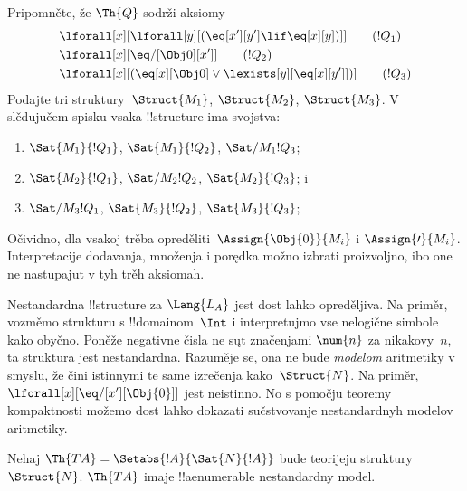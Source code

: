 \documentclass[../../../include/open-logic-section]{subfiles}
\begin{document}
\begin{prob}
Pripomněte, že $\Th{Q}$ sodrži aksiomy
\begin{align*}
& \lforall[x][\lforall[y][(\eq[x'][y'] \lif \eq[x][y])]] \tag{$!Q_1$}\\
& \lforall[x][\eq/[\Obj 0][x']] \tag{$!Q_2$}\\
& \lforall[x][(\eq[x][\Obj 0] \lor \lexists[y][\eq[x][y']])] \tag{$!Q_3$}
\end{align*}
Podajte tri struktury~$\Struct{M_1}$, $\Struct{M_2}$, $\Struct{M_3}$. V
slědujučem spisku vsaka !!{structure} ima svojstva:
\begin{enumerate}
\item $\Sat{M_1}{!Q_1}$, $\Sat{M_1}{!Q_2}$, $\Sat/{M_1}{!Q_3}$;
\item $\Sat{M_2}{!Q_1}$, $\Sat/{M_2}{!Q_2}$, $\Sat{M_2}{!Q_3}$; i
\item $\Sat/{M_3}{!Q_1}$, $\Sat{M_3}{!Q_2}$, $\Sat{M_3}{!Q_3}$;
\end{enumerate}
Očividno, dla vsakoj trěba opreděliti~$\Assign{\Obj{0}}{M_i}$ i
$\Assign{\prime}{M_i}$. Interpretacije dodavanja, množenja i porędka
možno izbrati proizvoljno, ibo one ne nastupajut v tyh trěh aksiomah.
\end{prob}

\begin{explain}
Nestandardna !!{structure} za $\Lang{L_A}$ jest dost lahko opreděljiva.
Na priměr, vozměmo strukturu s !!{domain}om~$\Int$
i interpretujmo vse nelogične simbole kako obyčno. Poněže negativne čisla
ne sųt značenjami $\num{n}$ za nikakovy~$n$, ta struktura jest
nestandardna. Razuměje se, ona ne bude \emph{modelom} aritmetiky
v smyslu, že čini istinnymi te same izrečenja
kako~$\Struct{N}$. Na priměr, $\lforall[x][\eq/[x'][\Obj{0}]]$ jest
neistinno. No s pomočju teoremy kompaktnosti možemo dost lahko dokazati
sučstvovanje nestandardnyh modelov aritmetiky.
\end{explain}

\begin{prop}
Nehaj $\Th{TA} = \Setabs{!A}{\Sat{N}{!A}}$ bude teorijeju
struktury~$\Struct{N}$. $\Th{TA}$ imaje !!a{enumerable} nestandardny model.
\end{prop}
\end{document}
